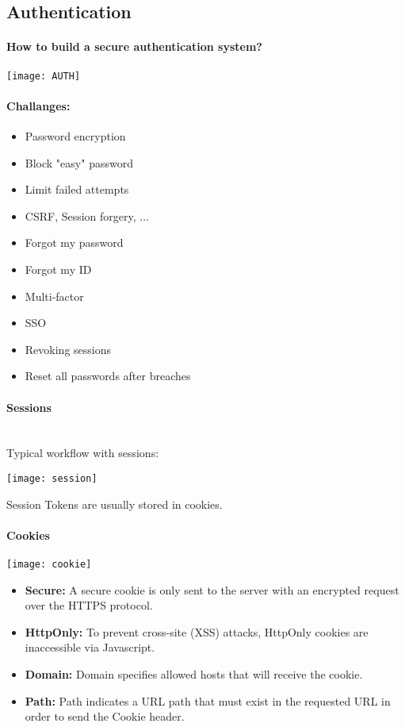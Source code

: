 \documentclass[../ESOF_notes.tex]{subfiles}
\begin{document}
\subsection{Authentication} 

\paragraph{How to build a secure authentication system?}
\begin{center}
    \texttt{[image: AUTH]}
\end{center}

\paragraph{Challanges:}
\begin{itemize}
    \item Password encryption
    \item Block "easy" password
    \item Limit failed attempts
    \item CSRF, Session forgery, ...
    \item Forgot my password
    \item Forgot my ID
    \item Multi-factor
    \item SSO
    \item Revoking sessions
    \item Reset all passwords after breaches
\end{itemize}

\paragraph{Sessions}\mbox{}\\

Typical workflow with sessions:
\begin{center}
    \texttt{[image: session]}
\end{center}

Session Tokens are usually stored in cookies.

\paragraph{Cookies}
\begin{center}
    \texttt{[image: cookie]}
\end{center}
\begin{itemize}
    \item \textbf{Secure:} A secure cookie is only sent to the server with an encrypted request over the HTTPS protocol.
    \item \textbf{HttpOnly:} To prevent cross-site (XSS) attacks, HttpOnly cookies are inaccessible via Javascript.
    \item \textbf{Domain:} Domain specifies allowed hosts that will receive the cookie.
    \item \textbf{Path:} Path indicates a URL path that must exist in the requested URL in order to send the Cookie header.
\end{itemize}
\end{document}

